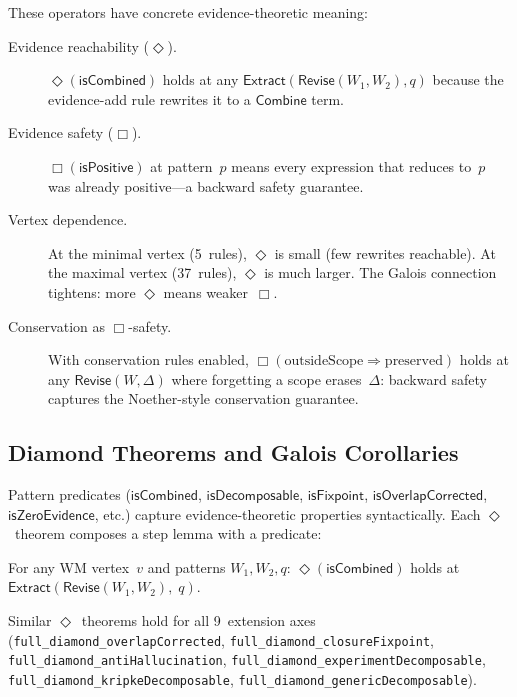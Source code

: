 \documentclass[11pt,openany]{report}
\begin{document}
These operators have concrete evidence-theoretic meaning:

\begin{description}
\item[Evidence reachability ($\Diamond$).]
  $\Diamond(\mathsf{isCombined})$ holds at any
  $\mathsf{Extract}(\mathsf{Revise}(W_1, W_2), q)$ because the
  evidence-add rule rewrites it to a $\mathsf{Combine}$ term.

\item[Evidence safety ($\Box$).]
  $\Box(\mathsf{isPositive})$ at pattern~$p$ means every expression that
  reduces to~$p$ was already positive---a backward safety guarantee.

\item[Vertex dependence.]
  At the minimal vertex (5~rules), $\Diamond$ is small (few rewrites
  reachable).  At the maximal vertex (37~rules), $\Diamond$ is much
  larger.  The Galois connection tightens:
  more $\Diamond$ means weaker~$\Box$.

\item[Conservation as $\Box$-safety.]
  With conservation rules enabled, $\Box(\text{outsideScope} \Rightarrow
  \text{preserved})$ holds at any $\mathsf{Revise}(W, \Delta)$ where
  forgetting a scope erases~$\Delta$: backward safety captures the
  Noether-style conservation guarantee.
\end{description}

\subsection{Diamond Theorems and Galois Corollaries}

Pattern predicates ($\mathsf{isCombined}$, $\mathsf{isDecomposable}$,
$\mathsf{isFixpoint}$, $\mathsf{isOverlapCorrected}$,
$\mathsf{isZeroEvidence}$, etc.) capture evidence-theoretic properties
syntactically.  Each $\Diamond$~theorem composes a step lemma with a
predicate:

\begin{theorem}
For any WM vertex~$v$ and patterns $W_1, W_2, q$:
$\Diamond(\mathsf{isCombined})$ holds at
$\mathsf{Extract}(\mathsf{Revise}(W_1, W_2),\; q)$.
\end{theorem}

\noindent
Similar $\Diamond$~theorems hold for all 9~extension axes
(\texttt{full\_diamond\_overlapCorrected},
\texttt{full\_diamond\_closureFixpoint},
\texttt{full\_diamond\_antiHallucination},
\texttt{full\_diamond\_experimentDecomposable},
\texttt{full\_diamond\_kripkeDecomposable},
\texttt{full\_diamond\_genericDecomposable}).
\end{document}

